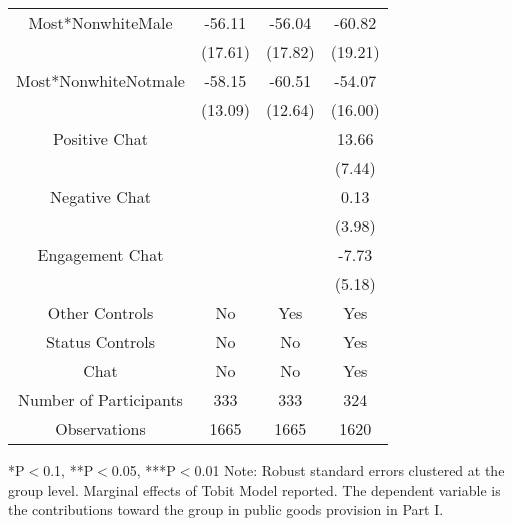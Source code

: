 \begin{table}[htbp]
\begin{tabular}{c c c c}
Most*NonwhiteMale         &   -56.11\sym{***} &     -56.04\sym{***}     &   -60.82\sym{***}  \\
                                 &  (17.61)        &     (17.82)             &  (19.21) \\
Most*NonwhiteNotmale    &   -58.15\sym{***} &   -60.51\sym{***}     &  -54.07\sym{***}  \\
                                 &  (13.09)        &     (12.64)             &  (16.00)   \\
Positive Chat                        &                     &                       &  13.66\sym{*}  \\
                                 &                     &                           &  (7.44)  \\
Negative  Chat                       &                     &                       &  0.13  \\
                                 &                     &                           &  (3.98)  \\
Engagement Chat                      &                     &                       &  -7.73  \\
                                 &                     &                           &  (5.18)  \\
\midrule
Other Controls                   &    No               &    Yes                    &    Yes        \\
Status Controls                    &    No               &    No                   &    Yes        \\
Chat                             &    No               &    No                     &    Yes        \\
\midrule
Number of Participants           &    333               &    333                   &    324        \\
\midrule
Observations                     &       1665          &       1665                &  1620    \\
\bottomrule

\end{tabular}
\begin{footnotesize}
\newline
*P$<$0.1, **P$<$0.05, ***P$<$0.01
\newline
Note: Robust standard errors clustered at the group level. Marginal effects of Tobit Model reported. 
\newline
The dependent variable is the contributions toward the group in public goods provision in Part I.
\end{footnotesize}
\end{table}